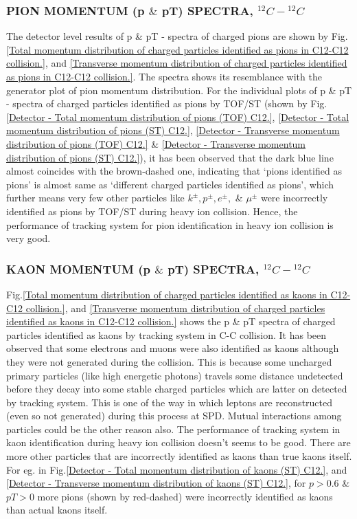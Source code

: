 \documentclass[12pt, twocolumn]{article}
\begin{document}
\subsubsection{PION MOMENTUM (p $\&$ pT) SPECTRA, $^{12}C-{^{12}C}$}
The detector level results of p \& pT - spectra of charged pions are shown by Fig.\ref{Total momentum distribution of charged particles identified as pions in C12-C12 collision.}, and \ref{Transverse momentum distribution of charged particles identified as pions in C12-C12 collision.}. The spectra shows its resemblance with the generator plot of pion momentum distribution. For the individual plots of p \& pT - spectra of charged particles identified as pions by TOF/ST (shown by Fig.\ref{Detector - Total momentum distribution of pions (TOF) C12.}, \ref{Detector - Total momentum distribution of pions (ST) C12.}, \ref{Detector - Transverse momentum distribution of pions (TOF) C12.} \& \ref{Detector - Transverse momentum distribution of pions (ST) C12.}), it has been observed that the dark blue line almost coincides with the brown-dashed one, indicating that `pions identified as pions' is almost same as `different charged particles identified as pions', which further means very few other particles like $k^{\pm}, p^{\pm}, e^{\pm},$ \& $\mu^{\pm}$ were incorrectly identified as pions by TOF/ST during heavy ion collision. Hence, the performance of tracking system for pion identification in heavy ion collision is very good.

\subsubsection{KAON MOMENTUM (p $\&$ pT) SPECTRA, $^{12}C-{^{12}C}$}
\label{KAON MOMENTUM (p and pT) SPECTRA, C12-C12}
Fig.\ref{Total momentum distribution of charged particles identified as kaons in C12-C12 collision.}, and \ref{Transverse momentum distribution of charged particles identified as kaons in C12-C12 collision.} shows the p \& pT spectra of charged particles identified as kaons by tracking system in C-C collision. It has been observed that some electrons and muons were also identified as kaons although they were not generated during the collision. This is because some uncharged primary particles (like high energetic photons) travels some distance undetected before they decay into some stable charged particles which are latter on detected by tracking system. This is one of the way in which leptons are reconstructed (even so not generated) during this process at SPD. Mutual interactions among particles could be the other reason also. The performance of tracking system in kaon identification during heavy ion collision doesn't seems to be good. There are more other particles that are incorrectly identified as kaons than true kaons itself. For eg. in Fig.\ref{Detector - Total momentum distribution of kaons (ST) C12.}, and \ref{Detector - Transverse momentum distribution of kaons (ST) C12.}, for $p > 0.6$ \& $pT > 0$ more pions (shown by red-dashed) were incorrectly identified as kaons than actual kaons itself.
\end{document}
